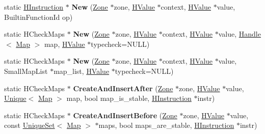 \begin{DoxyCompactItemize}
\item 
\hypertarget{classv8_1_1internal_1_1_v8___f_i_n_a_l_af7b093fb0aa1a13f8874437d2aece8b9}{}static \hyperlink{classv8_1_1internal_1_1_h_instruction}{H\+Instruction} $\ast$ {\bfseries New} (\hyperlink{classv8_1_1internal_1_1_zone}{Zone} $\ast$zone, \hyperlink{classv8_1_1internal_1_1_h_value}{H\+Value} $\ast$context, \hyperlink{classv8_1_1internal_1_1_h_value}{H\+Value} $\ast$value, Builtin\+Function\+Id op)\label{classv8_1_1internal_1_1_v8___f_i_n_a_l_af7b093fb0aa1a13f8874437d2aece8b9}

\item 
\hypertarget{classv8_1_1internal_1_1_v8___f_i_n_a_l_ac3c82233943ea85e497f61aebcbad0eb}{}static H\+Check\+Maps $\ast$ {\bfseries New} (\hyperlink{classv8_1_1internal_1_1_zone}{Zone} $\ast$zone, \hyperlink{classv8_1_1internal_1_1_h_value}{H\+Value} $\ast$context, \hyperlink{classv8_1_1internal_1_1_h_value}{H\+Value} $\ast$value, \hyperlink{classv8_1_1internal_1_1_handle}{Handle}$<$ \hyperlink{classv8_1_1internal_1_1_map}{Map} $>$ map, \hyperlink{classv8_1_1internal_1_1_h_value}{H\+Value} $\ast$typecheck=N\+U\+L\+L)\label{classv8_1_1internal_1_1_v8___f_i_n_a_l_ac3c82233943ea85e497f61aebcbad0eb}

\item 
\hypertarget{classv8_1_1internal_1_1_v8___f_i_n_a_l_aed4ddae394174e2157935d9eeade3656}{}static H\+Check\+Maps $\ast$ {\bfseries New} (\hyperlink{classv8_1_1internal_1_1_zone}{Zone} $\ast$zone, \hyperlink{classv8_1_1internal_1_1_h_value}{H\+Value} $\ast$context, \hyperlink{classv8_1_1internal_1_1_h_value}{H\+Value} $\ast$value, Small\+Map\+List $\ast$map\+\_\+list, \hyperlink{classv8_1_1internal_1_1_h_value}{H\+Value} $\ast$typecheck=N\+U\+L\+L)\label{classv8_1_1internal_1_1_v8___f_i_n_a_l_aed4ddae394174e2157935d9eeade3656}

\item 
\hypertarget{classv8_1_1internal_1_1_v8___f_i_n_a_l_a9850d7de353c71fe4732353d03106715}{}static H\+Check\+Maps $\ast$ {\bfseries Create\+And\+Insert\+After} (\hyperlink{classv8_1_1internal_1_1_zone}{Zone} $\ast$zone, \hyperlink{classv8_1_1internal_1_1_h_value}{H\+Value} $\ast$value, \hyperlink{classv8_1_1internal_1_1_unique}{Unique}$<$ \hyperlink{classv8_1_1internal_1_1_map}{Map} $>$ map, bool map\+\_\+is\+\_\+stable, \hyperlink{classv8_1_1internal_1_1_h_instruction}{H\+Instruction} $\ast$instr)\label{classv8_1_1internal_1_1_v8___f_i_n_a_l_a9850d7de353c71fe4732353d03106715}

\item 
\hypertarget{classv8_1_1internal_1_1_v8___f_i_n_a_l_ae8323e38c4ffe63ed1f8ab8293304271}{}static H\+Check\+Maps $\ast$ {\bfseries Create\+And\+Insert\+Before} (\hyperlink{classv8_1_1internal_1_1_zone}{Zone} $\ast$zone, \hyperlink{classv8_1_1internal_1_1_h_value}{H\+Value} $\ast$value, const \hyperlink{classv8_1_1internal_1_1_unique_set}{Unique\+Set}$<$ \hyperlink{classv8_1_1internal_1_1_map}{Map} $>$ $\ast$maps, bool maps\+\_\+are\+\_\+stable, \hyperlink{classv8_1_1internal_1_1_h_instruction}{H\+Instruction} $\ast$instr)\label{classv8_1_1internal_1_1_v8___f_i_n_a_l_ae8323e38c4ffe63ed1f8ab8293304271}


\end{DoxyCompactItemize}
